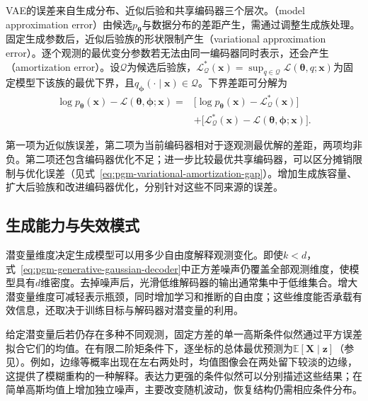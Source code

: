 VAE的误差来自生成分布、近似后验和共享编码器三个层次。（model approximation error）由候选$p_{\bm{\theta}}$与数据分布的差距产生，需通过调整生成族处理。固定生成参数后，近似后验族的形状限制产生（variational approximation error）。逐个观测的最优变分参数若无法由同一编码器同时表示，还会产生（amortization error）。设$\mathcal{Q}$为候选后验族，$\mathcal{L}_{\mathcal{Q}}^*(\bm{x})=\sup_{q\in\mathcal{Q}}\mathcal{L}(\bm{\theta},q;\bm{x})$为固定模型下该族的最优下界，且$q_{\bm{\phi}}(\cdot\mid\bm{x})\in\mathcal{Q}$。下界差距可分解为
\begin{equation}
  \label{eq:pgm-generative-inference-gaps}
  \begin{aligned}
    \log p_{\bm{\theta}}(\bm{x})
      -\mathcal{L}(\bm{\theta},\bm{\phi};\bm{x})
    ={}&\bigl[\log p_{\bm{\theta}}(\bm{x})
             -\mathcal{L}_{\mathcal{Q}}^*(\bm{x})\bigr]\\
       &+\bigl[\mathcal{L}_{\mathcal{Q}}^*(\bm{x})
             -\mathcal{L}(\bm{\theta},\bm{\phi};\bm{x})\bigr].
  \end{aligned}
\end{equation}

第一项为近似族误差，第二项为当前编码器相对于逐观测最优解的差距，两项均非负。第二项还包含编码器优化不足；进一步比较最优共享编码器，可以区分摊销限制与优化误差（见式~\eqref{eq:pgm-variational-amortization-gap}）。增加生成族容量、扩大后验族和改进编码器优化，分别针对这些不同来源的误差。

\subsection{生成能力与失效模式}
\label{sec:pgm-generative-vae-failure}

潜变量维度决定生成模型可以用多少自由度解释观测变化。即使$k<d$，式~\eqref{eq:pgm-generative-gaussian-decoder}中正方差噪声仍覆盖全部观测维度，使模型具有$d$维密度。去掉噪声后，光滑低维解码器的输出通常集中于低维集合。增大潜变量维度可减轻表示瓶颈，同时增加学习和推断的自由度；这些维度能否承载有效信息，还取决于训练目标与解码器对潜变量的利用。

给定潜变量后若仍存在多种不同观测，固定方差的单一高斯条件似然通过平方误差拟合它们的均值。在有限二阶矩条件下，逐坐标的总体最优预测为$\mathbb E[\bm X\mid\bm z]$（参见）。例如，边缘等概率出现在左右两处时，均值图像会在两处留下较淡的边缘，这提供了模糊重构的一种解释。表达力更强的条件似然可以分别描述这些结果；在简单高斯均值上增加独立噪声，主要改变随机波动，恢复结构仍需相应条件分布。

